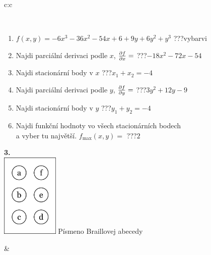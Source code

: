 \documentclass[10pt]{report}
\begin{document}
\begin{tabular}{c:c}
\begin{minipage}[c][104.5mm][t]{0.5\linewidth}
\begin{center}
\begin{minipage}{0.95\linewidth}
\begin{center}
\end{center}
\end{minipage}
\\[1mm]
\begin{minipage}{0.79\linewidth}
\begin{center}
\begin{varwidth}{\linewidth}
\begin{enumerate}
\normalsize
\item $f(x,y)=-6x^3-36x^2-54x+6+9y+6y^2+y^3$\quad \dotfill\; ???\;\dotfill \quad vybarvi
\item Najdi parciální derivaci podle $x$, $\pdv{f}{x}=$\quad \dotfill\; ???\;\dotfill \quad $-18x^2-72x-54$
\item Najdi stacionární body v $x$\quad \dotfill\; ???\;\dotfill \quad $x_1+x_2=-4$
\item Najdi parciální derivaci podle $y$, $\pdv{f}{y}=$\quad \dotfill\; ???\;\dotfill \quad $3y^2+12y-9$
\item Najdi stacionární body v $y$\quad \dotfill\; ???\;\dotfill \quad $y_1+y_2=-4$
\item Najdi funkční hodnoty vo všech stacionárních bodech \\ \phantom{xxxxxx} a vyber tu najvětší. $f_{\text{max}}(x,y)=$\quad \dotfill\; ???\;\dotfill \quad $2$
\end{enumerate}
\end{varwidth}
\end{center}
\end{minipage}
\begin{minipage}{0.20\linewidth}
\begin{center}
{\Huge\bfseries 3.} \\[2mm]
\includegraphics[height=40mm]{../images/braille.png}
{\small Písmeno Braillovej abecedy}
\end{center}
\end{minipage}
\end{center}
\end{minipage}
&
\begin{minipage}[c][104.5mm][t]{0.5\linewidth}
\begin{center}

\end{center}
\end{minipage}
\end{tabular}
\end{document}
